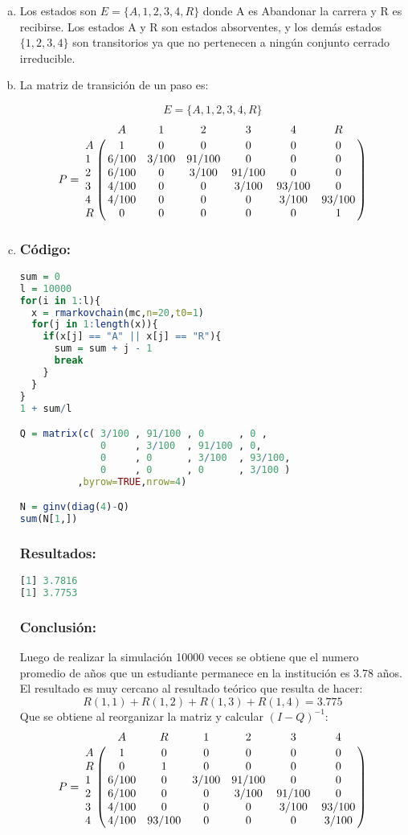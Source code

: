 \documentclass{article}
\begin{document}
\begin{enumerate}[(a)] 
\item Los estados son $ E = \{A,1,2,3,4,R\} $ donde A es Abandonar la carrera y R es recibirse. Los estados A y R son estados absorventes, y los demás estados $\{1,2,3,4\}$ son transitorios ya que no pertenecen a ningún conjunto cerrado irreducible.
\item La matriz de transición de un paso es:

$$ E = \{A,1,2,3,4,R\} $$
$$
P = 
\bordermatrix{ 
\text{} & A & 1 & 2 & 3 & 4 & R\cr
A & 1 & 0 & 0 & 0 & 0 & 0 \cr
1 & 6/100 & 3/100 & 91/100 & 0 & 0 & 0 \cr
2 & 6/100 & 0 & 3/100 & 91/100 & 0 & 0 \cr
3 & 4/100 & 0 & 0 & 3/100 & 93/100 & 0 \cr
4 & 4/100 & 0 & 0 & 0 & 3/100 & 93/100 \cr
R & 0 & 0 & 0 & 0 & 0 & 1 
}
$$




\item 
\subsubsection*{Código:}
\begin{lstlisting}[language=R]
sum = 0
l = 10000
for(i in 1:l){
  x = rmarkovchain(mc,n=20,t0=1)
  for(j in 1:length(x)){
    if(x[j] == "A" || x[j] == "R"){
      sum = sum + j - 1
      break
    }
  }
}
1 + sum/l

Q = matrix(c( 3/100 , 91/100 , 0      , 0 ,
              0     , 3/100  , 91/100 , 0,
              0     , 0      , 3/100  , 93/100,
              0     , 0      , 0      , 3/100 )
          ,byrow=TRUE,nrow=4)

N = ginv(diag(4)-Q)
sum(N[1,])
\end{lstlisting}

\subsubsection*{Resultados:}
\begin{lstlisting}[language=R]
[1] 3.7816
[1] 3.7753
\end{lstlisting}

\subsubsection*{Conclusión:}
Luego de realizar la simulación 10000 veces se obtiene que el numero promedio de años que un estudiante permanece en la institución es 3.78 años. El resultado es muy cercano al resultado teórico que resulta de hacer: $$R(1,1) + R(1,2) + R(1,3) + R(1,4) = 3.775$$
Que se obtiene al reorganizar la matriz y calcular $(I - Q)^{-1}$:
$$ P = 
\bordermatrix{ 
\text{} & A & R & 1 & 2 & 3 & 4 \cr
A & 1 & 0 & 0 & 0 & 0 & 0  \cr
R & 0 & 1 & 0 & 0 & 0 & 0  \cr
1 & 6/100 & 0 & 3/100 & 91/100 & 0 & 0  \cr
2 & 6/100 & 0 & 0 & 3/100 & 91/100 & 0  \cr
3 & 4/100 & 0 & 0 & 0 & 3/100 & 93/100  \cr
4 & 4/100 & 93/100 & 0 & 0 & 0 & 3/100 
} $$
\end{enumerate}
\end{document}
